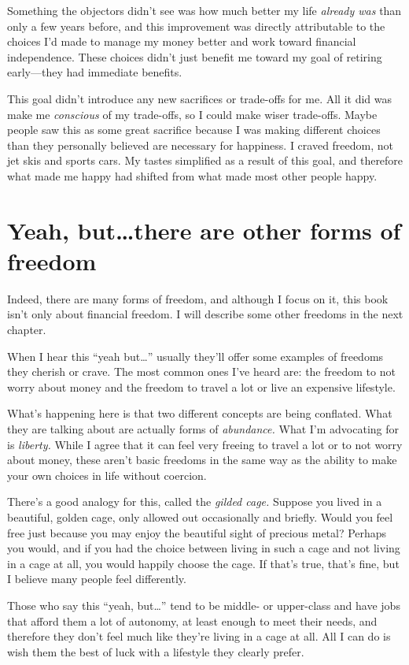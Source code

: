 Something the objectors didn't see was how much better my life \emph{already was} than only a few years before, and this improvement was directly attributable to the choices I'd made to manage my money better and work toward financial independence. These choices didn't just benefit me toward my goal of retiring early---they had immediate benefits.

This goal didn't introduce any new sacrifices or trade-offs for me. All it did was make me \emph{conscious} of my trade-offs, so I could make wiser trade-offs. Maybe people saw this as some great sacrifice because I was making different choices than they personally believed are necessary for happiness. I craved freedom, not jet skis and sports cars. My tastes simplified as a result of this goal, and therefore what made me happy had shifted from what made most other people happy.

\section{Yeah, but\ldots there are other forms of freedom}
Indeed, there are many forms of freedom, and although I focus on it, this book isn't only about financial freedom. I will describe some other freedoms in the next chapter.

When I hear this ``yeah but\ldots'' usually they'll offer some examples of freedoms they cherish or crave. The most common ones I've heard are: the freedom to not worry about money and the freedom to travel a lot or live an expensive lifestyle.

What's happening here is that two different concepts are being conflated. What they are talking about are actually forms of \emph{abundance.} What I'm advocating for is \emph{liberty.} While I agree that it can feel very freeing to travel a lot or to not worry about money, these aren't basic freedoms in the same way as the ability to make your own choices in life without coercion.

There's a good analogy for this, called the \emph{gilded cage.} Suppose you lived in a beautiful, golden cage, only allowed out occasionally and briefly. Would you feel free just because you may enjoy the beautiful sight of precious metal? Perhaps you would, and if you had the choice between living in such a cage and not living in a cage at all, you would happily choose the cage. If that's true, that's fine, but I believe many people feel differently.

Those who say this ``yeah, but\ldots'' tend to be middle- or upper-class and have jobs that afford them a lot of autonomy, at least enough to meet their needs, and therefore they don't feel much like they're living in a cage at all. All I can do is wish them the best of luck with a lifestyle they clearly prefer.

